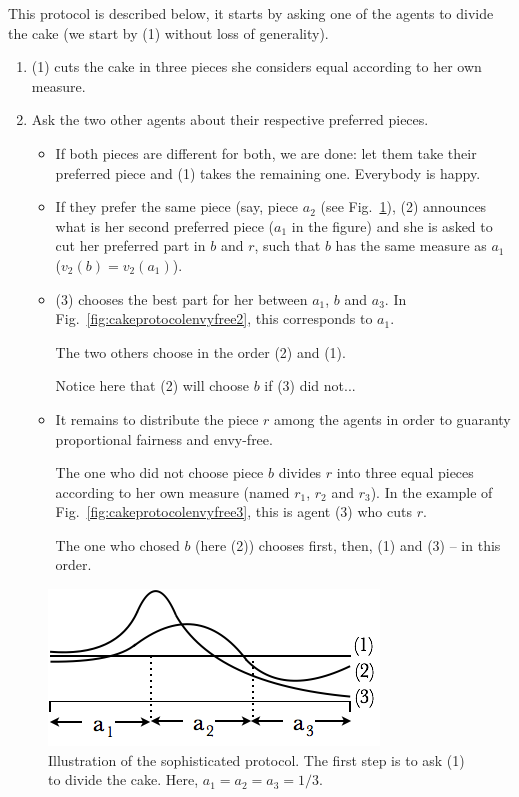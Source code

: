 This protocol is described below, it starts by asking one of the agents to divide the cake 
(we start by (1) without loss of generality).
\begin{enumerate}
\item 
(1) cuts the cake in three pieces she considers equal according to her own measure.
\item
Ask the two other agents about their respective preferred pieces.
\begin{itemize}
\item 
If both pieces are different for both, we are done:
let them take their preferred piece and (1) takes the remaining one.
Everybody is happy. 
\item
If they prefer the same piece (say, piece $a_2$ (see Fig.~\ref{fig:cakeprotocolenvyfree1}), 
(2) announces what is her second preferred piece ($a_1$ in the figure)
and she is asked to cut her preferred part in $b$ and $r$, 
such that $b$ has the same measure as $a_1$ ($v_2(b) = v_2(a_1)$).
\item 
(3) chooses the best part for her between $a_1$, $b$ and $a_3$.
In Fig.~\ref{fig:cakeprotocolenvyfree2}, this corresponds to $a_1$. 

The two others choose in the order (2) and (1).

Notice here that (2) will choose $b$ if (3) did not...
\item
It remains to distribute the piece $r$ among the agents in order to guaranty proportional fairness and envy-free.

The one who did not choose piece $b$ divides $r$ into three equal pieces
according to her own measure (named $r_1$, $r_2$ and $r_3$).
In the example of Fig.~\ref{fig:cakeprotocolenvyfree3}, this is agent (3) who cuts $r$.

The one who chosed $b$ (here (2)) chooses first, then, (1) and (3) -- in this order.
\end{itemize}
\end{enumerate}
\begin{figure}[htb]
\begin{center}
        \includegraphics[scale=0.6]{FiguresMaths/cakeprotocolenvyfree1}
        \caption{Illustration of the sophisticated protocol.
        The first step is to ask (1) to divide the cake. Here, $a_1=a_2=a_3=1/3$.}
        \label{fig:cakeprotocolenvyfree1}
\end{center}
\end{figure}
